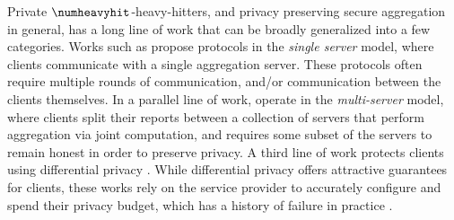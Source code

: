 Private $\numheavyhit$-heavy-hitters, and privacy preserving secure aggregation in general, has a long line of work that can be broadly generalized into a few categories.
Works such as \cite{CCS:BBGLR20, SP:LBVKH23, CCS:BIKMMP17, AC:LLPT23, SP:MWAPR23, ASIACCS:BSHV23, USENIX:BGLLMR23} propose protocols in the \emph{single server} model, where clients communicate with a single aggregation server.
These protocols often require multiple rounds of communication, and/or communication between the clients themselves.
In a parallel line of work, \cite{EPRINT:DPRS23, prio, SCN:AGJOP22, EPRINT:BanCheVen24, PoPETS:MouSarTso24, PoPETS:MPDST25, SP:BBCGI21, EPRINT:BBCGKR24, zhu2020federated, SP:RSWP23} operate in the \emph{multi-server} model, where clients split their reports between a collection of servers that perform aggregation via joint computation, and requires some subset of the servers to remain honest in order to preserve privacy.
A third line of work \cite{bittau2017prochlo, bassily2017practical, STOC:BasSmi15, bun2019heavy, CCS:QYYKXR16} protects clients using differential privacy \autocite{TCC:DMNS06}.
While differential privacy offers attractive guarantees for clients, these works rely on the service provider to accurately configure and spend their privacy budget, which has a history of failure in practice \autocite{tang2017privacy}.
